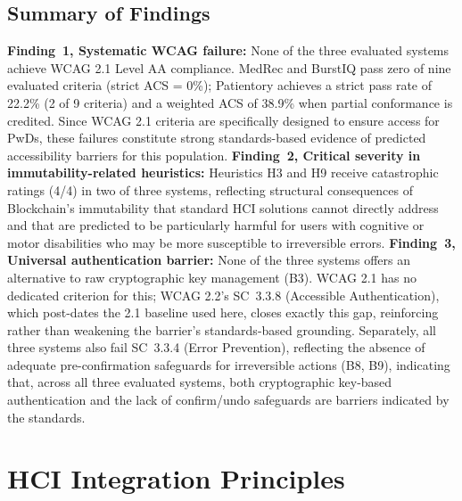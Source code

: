 \documentclass[journal,onecolumn]{IEEEtran}
\begin{document}
\subsection{Summary of Findings}
\label{sec:gap-analysis} \textbf{Finding~1, Systematic WCAG failure:} None of the three evaluated systems achieve WCAG 2.1 Level AA compliance. MedRec and BurstIQ pass zero of nine evaluated criteria (strict ACS = 0\%); Patientory achieves a strict pass rate of 22.2\% (2 of 9 criteria) and a weighted ACS of 38.9\% when partial conformance is credited. Since WCAG 2.1 criteria are specifically designed to ensure access for PwDs, these failures constitute strong standards-based evidence of predicted accessibility barriers for this population. \textbf{Finding~2, Critical severity in immutability-related heuristics:} Heuristics H3 and H9 receive catastrophic ratings (4/4) in two of three systems, reflecting structural consequences of Blockchain's immutability that standard HCI solutions cannot directly address and that are predicted to be particularly harmful for users with cognitive or motor disabilities who may be more susceptible to irreversible errors. \textbf{Finding~3, Universal authentication barrier:} None of the three systems offers an alternative to raw cryptographic key management (B3). WCAG 2.1 has no dedicated criterion for this; WCAG 2.2's SC~3.3.8 (Accessible Authentication), which post-dates the 2.1 baseline used here, closes exactly this gap, reinforcing rather than weakening the barrier's standards-based grounding. Separately, all three systems also fail SC~3.3.4 (Error Prevention), reflecting the absence of adequate pre-confirmation safeguards for irreversible actions (B8, B9), indicating that, across all three evaluated systems, both cryptographic key-based authentication and the lack of confirm/undo safeguards are barriers indicated by the standards.


\section{HCI Integration Principles}
\label{sec:principles}
\end{document}
